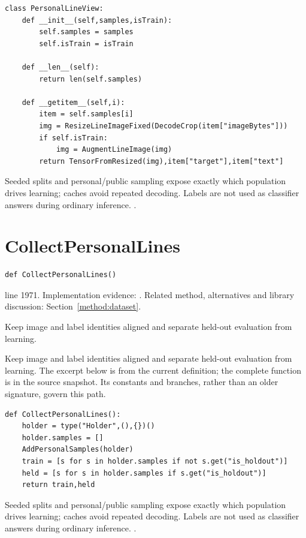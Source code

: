 \begin{lstlisting}[style=plain]
class PersonalLineView:
    def __init__(self,samples,isTrain):
        self.samples = samples
        self.isTrain = isTrain

    def __len__(self):
        return len(self.samples)

    def __getitem__(self,i):
        item = self.samples[i]
        img = ResizeLineImageFixed(DecodeCrop(item["imageBytes"]))
        if self.isTrain:
            img = AugmentLineImage(img)
        return TensorFromResized(img),item["target"],item["text"]
\end{lstlisting}
Seeded splits and personal/public sampling expose exactly which population drives learning; caches avoid repeated decoding. Labels are not used as classifier answers during ordinary inference. \cite{marti2002,code2026,torchdata}.


\section{CollectPersonalLines}\label{fn:train:CollectPersonalLines}
\begin{lstlisting}[style=sig]
def CollectPersonalLines()
\end{lstlisting}
 line 1971. Implementation evidence: \cite{code2026}. Related method, alternatives and library discussion: Section~\ref{method:dataset}.


Keep image and label identities aligned and separate held-out evaluation from learning.


Keep image and label identities aligned and separate held-out evaluation from learning. The excerpt below is from the current definition; the complete function is in the source snapshot. Its constants and branches, rather than an older signature, govern this path.


\begin{lstlisting}[style=plain]
def CollectPersonalLines():
    holder = type("Holder",(),{})()
    holder.samples = []
    AddPersonalSamples(holder)
    train = [s for s in holder.samples if not s.get("is_holdout")]
    held = [s for s in holder.samples if s.get("is_holdout")]
    return train,held
\end{lstlisting}
Seeded splits and personal/public sampling expose exactly which population drives learning; caches avoid repeated decoding. Labels are not used as classifier answers during ordinary inference. \cite{marti2002,code2026,torchdata}.


